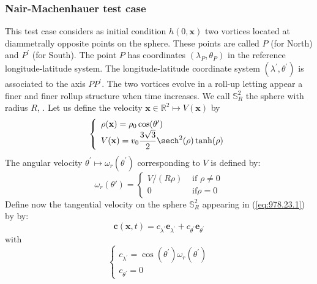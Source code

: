 \subsubsection{Nair-Machenhauer test case}

\label{sec:4.1}
This test case \cite{Nair-Machenhauer}
considers
as initial condition $h(0,\mathbf{x})$
two vortices located
at diammetrally opposite points on the sphere.
These points are called $P$ (for North) and $P^\prime$ (for South).
The point $P$ has coordinates $(\lambda_P,\theta_P)$ in the reference
longitude-latitude system.
The longitude-latitude coordinate system 
$(\lambda^\prime,\theta^\prime)$ is associated to 
the axis $P  P^\prime$. The two vortices evolve in a roll-up
letting appear a finer and finer rollup structure when time increases.
We call $\mathbb{S}^2_R$ the sphere with radius $R$, 
\cite{Nair-Cote-Stanisforth,Nair-Machenhauer}.
Let us define the velocity $\mathbf{x} \in \mathbb{R}^2 \mapsto V(\mathbf{x})$ 
by
\begin{equation}
\left\{
\begin{array}{l}
\rho(\mathbf{x})=\rho_0 \cos(\theta^\prime)\\
V(\mathbf{x}) = v_0 \dfrac{3 \sqrt{3} }{2} \sech^2 ( \rho ) \tanh ( \rho )
\end{array}
\right.
\end{equation} 
The angular velocity $\theta^\prime \mapsto \omega_r(\theta^\prime)$ 
corresponding to $V$ 
is defined by:
\begin{equation}
   \omega_r ( \theta' ) = \left\{ 
   \begin{array}{ll}
      V/( R \rho ) & \text{ if } \rho \neq 0 \\
      0 & \text{ if} \rho =0
   \end{array}
   \right.
\label{vitesse_angulaire}
\end{equation}
Define now the tangential velocity on the sphere $\mathbb{S}^2_R$ 
appearing in (\ref{eq:978.23.1}) by
by:
\begin{equation}
\mathbf{c}(\mathbf{x},t)=c_{\lambda^\prime} \mathbf{e}_{\lambda^\prime}+
c_{\theta^\prime} \mathbf{e}_{\theta^\prime}
\end{equation}
with
\begin{equation}
\left\{
\begin{array}{l}
c_{\lambda^\prime}=\cos(\theta^\prime) \omega_r(\theta^\prime)\\
c_{\theta^\prime}=0
\end{array}
\right.
\end{equation}

